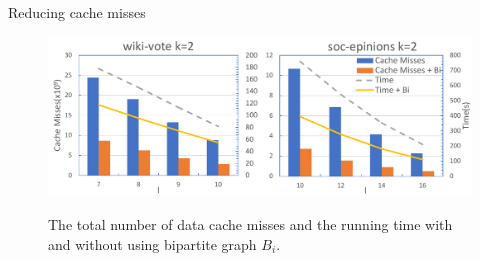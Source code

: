\documentclass[9pt]{beamer} %
\begin{document}
\begin{frame}{Reducing cache misses}
    \begin{figure}[htb]
        \centering
        \includegraphics[width=0.8\linewidth]{pic/bipartite.pdf}\\
        \caption{The total number of data cache misses and the running time with and without using bipartite graph $B_i$.}
    \end{figure}
\end{frame}
\end{document}
